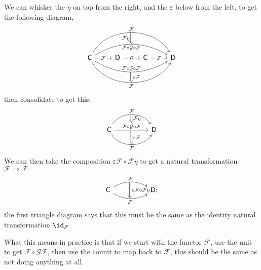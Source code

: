 \documentclass[notes.tex]{subfiles}
\begin{document}
We can whisker the $\eta$ on top from the right, and the $\varepsilon$ below from the left, to get the following diagram,
\begin{equation*}
  \begin{tikzcd}
    \mathsf{C}
    \arrow[r, rightarrow, "\mathcal{F}" description]
    \arrow[rrr, rightarrow, bend right=60, swap, "\mathcal{F}"{name=D}]
    \arrow[rrr, rightarrow, bend left=60, "\mathcal{F}"{name=U}]
    \arrow[rrr, rightarrow, bend left=30, swap, "\mathcal{F} \circ \mathcal{G} \circ \mathcal{F}"{name=MU}]
    \arrow[rrr, rightarrow, bend right=30, "\mathcal{F} \circ \mathcal{G} \circ \mathcal{F}"{name=MD}]
    & \mathsf{D}
    \arrow[from=U, to=MU, Rightarrow, swap, "\mathcal{F}\eta"]
    \arrow[r, rightarrow, "\mathcal{G}" description]
    \arrow[from=MD, to=D, Rightarrow, "\varepsilon\mathcal{F}"]
    & \mathsf{C}
    \arrow[r, rightarrow, "\mathcal{F}" description]
    & \mathsf{D}
  \end{tikzcd}
\end{equation*}
then consolidate to get this:
\begin{equation*}
  \begin{tikzcd}[row sep=huge, column sep=huge]
    \mathsf{C}
    \arrow[r, rightarrow, bend left=60, "\mathcal{F}"{name=U}]
    \arrow[r, rightarrow, "\mathcal{F} \circ \mathcal{G} \circ \mathcal{F}"{name=M} description]
    \arrow[r, rightarrow, bend right=60, swap, "\mathcal{F}"{name=D}]
    & \mathsf{D}
    \arrow[from=U, to=M, Rightarrow, "\mathcal{F}\eta"]
    \arrow[from=M, to=D, Rightarrow, "\varepsilon\mathcal{F}"]
  \end{tikzcd}
\end{equation*}
We can then take the composition $\varepsilon \mathcal{F} \circ \mathcal{F}\eta$ to get a natural transformation $\mathcal{F} \Rightarrow \mathcal{F}$
\begin{equation*}
  \begin{tikzcd}[row sep=huge, column sep=huge]
    \mathsf{C}
    \arrow[r, bend left, rightarrow, "\mathcal{F}"{name=U}]
    \arrow[r, bend right, swap, rightarrow, "\mathcal{F}"{name=D}]
    \arrow[from=U, to=D, Rightarrow, "\varepsilon\mathcal{F} \circ \mathcal{F}\eta"]
    &\mathsf{D};
  \end{tikzcd}
\end{equation*}
the first triangle diagram says that this must be the same as the identity natural transformation $\id_{\mathcal{F}}$.

What this means in practice is that if we start with the functor $\mathcal{F}$, use the unit to get $\mathcal{F} \circ \mathcal{G} \mathcal{F}$, then use the counit to map back to $\mathcal{F}$, this should be the same as not doing anything at all.
\end{document}
